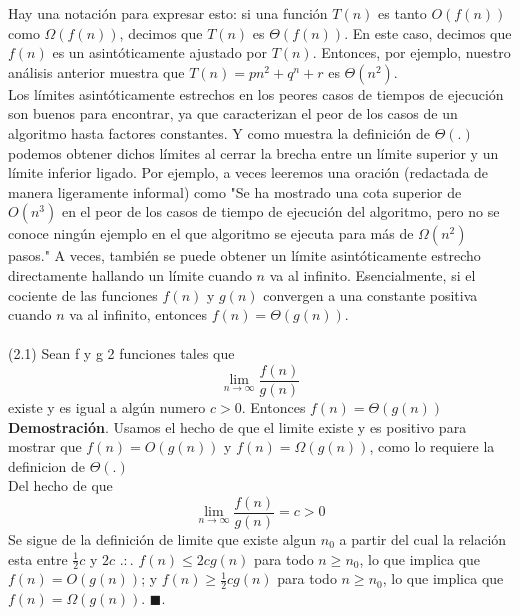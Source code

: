 \documentclass[a4paper]{article}
\begin{document}
Hay una notación para expresar esto: si una función $T(n)$ es tanto $O(f(n))$ como $\Omega(f (n))$, decimos que $T(n)$ es $\Theta (f (n))$. En este caso, decimos que $f(n)$ es un asintóticamente ajustado por $T(n)$. Entonces, por ejemplo, nuestro análisis anterior muestra que $T (n) = pn^2 + q^n + r$ es $\Theta(n^2)$.\\

Los límites asintóticamente estrechos en los peores casos de tiempos de ejecución son buenos para encontrar, ya que caracterizan el peor de los casos de un algoritmo hasta factores constantes. Y como muestra la definición de $\Theta(.)$ podemos obtener dichos límites al cerrar la brecha entre un límite superior y un límite inferior ligado. Por ejemplo, a veces leeremos una oración (redactada de manera ligeramente informal) como "Se ha mostrado una cota superior de $O(n^3)$ en el peor de los casos de tiempo de ejecución del algoritmo, pero no se conoce ningún ejemplo en el que algoritmo se ejecuta para más de $\Omega(n^2)$ pasos."  A veces, también se puede obtener un límite asintóticamente estrecho directamente hallando un límite cuando $n$ va al infinito. Esencialmente, si el cociente de las funciones $f(n)$ y $g(n)$ convergen a una constante positiva cuando $n$ va al infinito, entonces $f(n) = \Theta(g(n))$.  \\
\\
(2.1) Sean f y g 2 funciones tales que
\begin{equation}
\displaystyle\lim_{n \to \infty} \frac{f(n)}{g(n)}
\end{equation}
existe y es igual a algún numero $c > 0$. Entonces $f(n) =  \Theta(g(n))$\\

\textbf{Demostración}. Usamos el hecho de que el limite existe y es positivo para mostrar que $f(n) = O(g(n))$ y $f(n) = \Omega(g(n))$, como lo requiere la definicion de $\Theta(.)$\\

Del hecho de que
\begin{equation}
\displaystyle\lim_{n \to \infty} \frac{f(n)}{g(n)} = c > 0
\end{equation}
Se sigue de la definición de limite que existe algun $n_0$ a partir del cual la relación esta entre $\frac{1}{2}c$ y $2c$ $.:.$ $f(n) \leq 2c g(n)$ para todo $n \geq n_0$, lo que implica que $f(n) = O(g(n))$; y $f(n) \geq \frac{1}{2}c g(n)$ para todo $n \geq n_0$, lo que implica que $f(n) = \Omega(g(n))$. $\blacksquare$.\\
\end{document}
